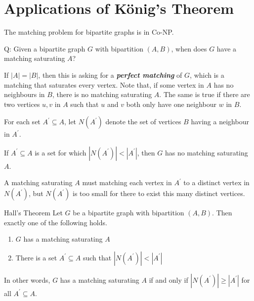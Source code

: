 \section{Applications of König's Theorem}
The matching problem for bipartite graphs is in Co-NP\@.

Q\@: Given a bipartite graph $ G $ with bipartition $ (A,B) $,
when does $ G $ have a matching saturating $ A $?

If $ |A|=|B| $, then this is asking for a \textbf{\emph{perfect matching}} of $ G $,
which is a matching that saturates every vertex. Note that,
if some vertex in $ A $ has no neighbours in $ B $, there is no matching saturating $ A $.
The same is true if there are two vertices $ u,v $ in $ A $ such that $ u $ and $ v $
both only have one neighbour $ w $ in $ B $.

For each set $ A^\prime \subseteq A $, let $ N(A^\prime) $ denote the set of vertices
$ B $ having a neighbour in $ A^\prime $.


\begin{Proposition}{}{}
    If $ A^\prime\subseteq A $ is a set for which $ |N(A^\prime)|<|A^\prime| $,
    then $ G $ has no matching saturating $ A $.
\end{Proposition}

\begin{Proof}{}{}
    A matching saturating $ A $ must matching each vertex in $ A^\prime $ to a distinct
    vertex in $ N(A^\prime) $, but $ N(A^\prime) $ is too small for there to
    exist this many distinct vertices.
\end{Proof}

\begin{Theorem}{Hall's Theorem}{}
    Let $ G $ be a bipartite graph with bipartition $ (A,B) $. Then exactly one
    of the following holds.
    \begin{enumerate}[label=(\arabic*)]
        \item $ G $ has a matching saturating $ A $
        \item There is a set $ A^\prime \subseteq A $ such that $ |N(A^\prime)|<|A^\prime| $
    \end{enumerate}
    In other words, $ G $ has a matching saturating $ A $ if and only if $ |N(A^\prime)|\geqslant |A^\prime| $
    for all $ A^\prime \subseteq A $.
\end{Theorem}

